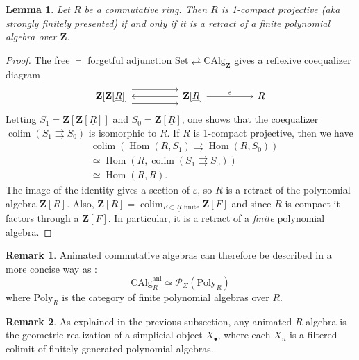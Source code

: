 \documentclass[11pt]{article}
\newtheorem{lemma}{Lemma}
\theoremstyle{definition}
\newtheorem{remark}{Remark}
\newcommand{\ani}{\mathrm{ani}}
\newcommand{\CAlg}{\mathrm{CAlg}}
\newcommand{\colim}{\operatorname*{colim}}
\newcommand{\Hom}{\operatorname{Hom}}
\renewcommand{\P}{\mathcal{P}}
\newcommand{\Poly}{\mathrm{Poly}}
\newcommand{\Set}{\mathrm{Set}}
\newcommand{\Z}{\mathbf{Z}}
\begin{document}
\begin{lemma}
    Let $R$ be a commutative ring.
    Then $R$ is 1-compact projective (aka strongly finitely presented) if and only if it is a retract of a finite polynomial algebra over $\Z$.
\end{lemma}
\begin{proof}
    The free $\dashv$ forgetful adjunction $\Set \rightleftarrows \CAlg_{\Z}$ gives a reflexive coequalizer diagram
    \[\begin{tikzcd}
        {\Z[\Z[\underline{R}]]} && {\Z[\underline{R}]} && R
        \arrow[shift left=3, from=1-1, to=1-3]
        \arrow[shift right=3, from=1-1, to=1-3]
        \arrow[from=1-3, to=1-1]
        \arrow["\varepsilon", from=1-3, to=1-5]
    \end{tikzcd}\]
    Letting $S_1 = \Z[\Z[\underline{R}]]$ and $S_0 = \Z[\underline{R}]$, one shows that the coequalizer $\colim(S_1 \rightrightarrows S_0)$ is isomorphic to $R$.
    If $R$ is 1-compact projective, then we have
    \begin{align*}
        &\colim(\Hom(R, S_1) \rightrightarrows \Hom(R, S_0))\\
        &\simeq \Hom(R, \colim(S_1 \rightrightarrows S_0))\\
        &\simeq \Hom(R, R).
    \end{align*}
    The image of the identity gives a section of $\varepsilon$, so $R$ is a retract of the polynomial algebra $\Z[\underline{R}]$.
    Also, $\Z[\underline{R}] = \colim_{F \subset \underline{R}\text{ finite}}\Z[F]$ and since $R$ is compact it factors through a $\Z[F]$. In particular, it is a retract of a \emph{finite} polynomial algebra.
\end{proof}

\begin{remark}
    Animated commutative algebras can therefore be described in a more concise way as :
    \[
        \CAlg_R^{\ani} \simeq \P_{\Sigma}(\Poly_R)
    \]
    where $\Poly_R$ is the category of finite polynomial algebras over $R$.
\end{remark}

\begin{remark}
    As explained in the previous subsection, any animated $R$-algebra is the geometric realization of a simplicial object $X_{\bullet}$, where each $X_n$ is a filtered colimit of finitely generated polynomial algebras.
\end{remark}
\end{document}
